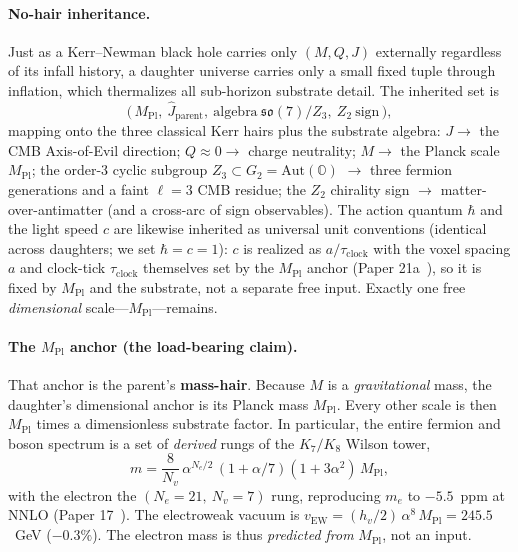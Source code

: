 \documentclass[11pt]{article}
\newcommand{\so}{\mathfrak{so}}
\newcommand{\Aut}{\mathrm{Aut}}
\newcommand{\HV}{h_v}
\newcommand{\Mpl}{M_{\mathrm{Pl}}}
\newcommand{\vEW}{v_{\mathrm{EW}}}
\begin{document}
\paragraph{No-hair inheritance.} Just as a Kerr--Newman black hole carries only $(M, Q, J)$ externally regardless of its infall history, a daughter universe carries only a small fixed tuple through inflation, which thermalizes all sub-horizon substrate detail. The inherited set is
\[ \big(\,\Mpl,\ \hat{J}_{\mathrm{parent}},\ \text{algebra}\ \so(7)/Z_3,\ Z_2\ \text{sign}\,\big), \]
mapping onto the three classical Kerr hairs plus the substrate algebra: $J \to$ the CMB Axis-of-Evil direction; $Q \approx 0 \to$ charge neutrality; $M \to$ the Planck scale $\Mpl$; the order-3 cyclic subgroup $Z_3 \subset G_2 = \Aut(\mathbb{O})$ $\to$ three fermion generations and a faint $\ell = 3$ CMB residue; the $Z_2$ chirality sign $\to$ matter-over-antimatter (and a cross-arc of sign observables). The action quantum $\hbar$ and the light speed $c$ are likewise inherited as universal unit conventions (identical across daughters; we set $\hbar = c = 1$): $c$ is realized as $a/\tau_{\mathrm{clock}}$ with the voxel spacing $a$ and clock-tick $\tau_{\mathrm{clock}}$ themselves set by the $\Mpl$ anchor (Paper 21a~\cite[\S 9.5]{Paper21a}), so it is fixed by $\Mpl$ and the substrate, not a separate free input. Exactly one free \emph{dimensional} scale---$\Mpl$---remains.

\paragraph{The $\Mpl$ anchor (the load-bearing claim).} That anchor is the parent's \textbf{mass-hair}. Because $M$ is a \emph{gravitational} mass, the daughter's dimensional anchor is its Planck mass $\Mpl$. Every other scale is then $\Mpl$ times a dimensionless substrate factor. In particular, the entire fermion and boson spectrum is a set of \emph{derived} rungs of the $K_7/K_8$ Wilson tower,
\[ m = \frac{8}{N_v}\,\alpha^{N_e/2}\,(1 + \alpha/7)(1 + 3\alpha^2)\,\Mpl, \]
with the electron the $(N_e = 21,\ N_v = 7)$ rung, reproducing $m_e$ to $-5.5$~ppm at NNLO (Paper 17~\cite{Paper17}). The electroweak vacuum is $\vEW = (\HV/2)\,\alpha^8\,\Mpl = 245.5$~GeV ($-0.3\%$). The electron mass is thus \emph{predicted from} $\Mpl$, not an input.
\end{document}
